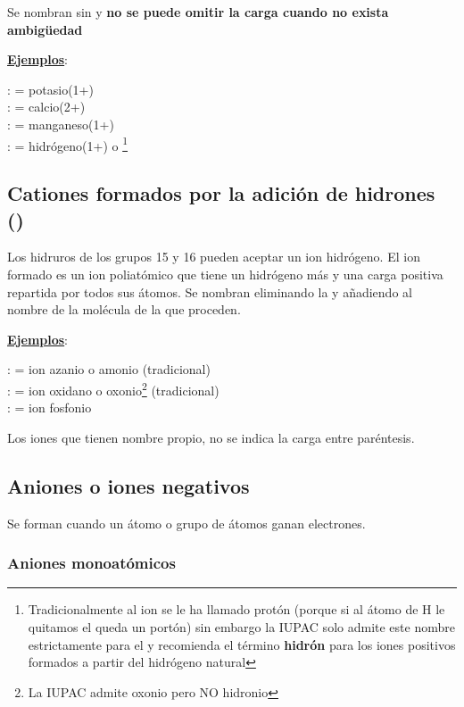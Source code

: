 \documentclass[12pt]{article}
\begin{document}
Se nombran sin  y \textbf{no se puede omitir la carga cuando no exista ambigüedad}

\textbf{\uline{Ejemplos}}:

\noindent {} :  = potasio(1+)\\
 :  = calcio(2+)\\
 :  = manganeso(1+)\\
 :  = hidrógeno(1+) o \footnote{Tradicionalmente al ion  se le ha llamado protón (porque si al átomo de H le quitamos el  queda un portón) sin embargo la IUPAC solo admite este nombre estrictamente para el  y recomienda el término \textbf{hidrón} para los iones positivos formados a partir del hidrógeno natural}

\subsection{Cationes formados por la adición de hidrones () }

Los hidruros de los grupos 15 y 16 pueden aceptar un ion hidrógeno. El ion formado es un ion poliatómico que tiene un hidrógeno más y una carga positiva repartida por todos sus átomos. Se nombran eliminando la  y añadiendo  al nombre de la molécula de la que proceden.

\noindent \textbf{\uline{Ejemplos}}:

\noindent {} :  = ion azanio o amonio (tradicional)\\
 :  = ion oxidano o oxonio\footnote{La IUPAC admite oxonio pero NO hidronio} (tradicional)\\
 :  = ion fosfonio

Los iones que tienen nombre propio, no se indica la carga entre paréntesis.

\subsection{Aniones o iones negativos}

Se forman cuando un átomo o grupo de átomos ganan electrones.

\subsubsection{Aniones monoatómicos}
\end{document}
